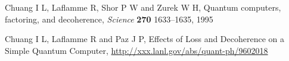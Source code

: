 \documentclass{article}
\begin{document}
\begin{thebibliography}{12}
% 
%  
% 
% 
% 
% 

Chuang I L, Laflamme R, Shor P W and Zurek W H,
Quantum computers, factoring, and decoherence,
{\em Science} {\bf 270} 1633--1635, 1995

 Chuang I L, Laflamme R and Paz J P, 
Effects of Loss and Decoherence on a Simple Quantum Computer,
\hyperref{http://xxx.lanl.gov/abs/quant-ph/9602018}{}{}
{http://xxx.lanl.gov/abs/quant-ph/9602018}



% 
% 
% 
% 
% 
% 
% 
% 
% 
% 
% 


\end{thebibliography}
\end{document}
